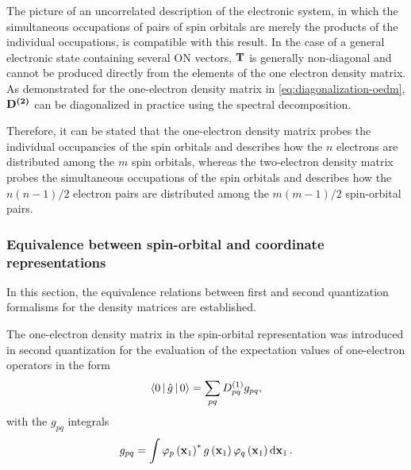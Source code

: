 The picture of an uncorrelated description of the electronic system, in which 
the simultaneous occupations of pairs of spin orbitals are merely the products 
of the individual occupations, is compatible with this result.
In the case of a general electronic state containing several ON vectors, $\boldsymbol{\mathrm{T}}$
is generally non-diagonal and cannot be produced directly from the elements of 
the one electron density matrix. As demonstrated for the one-electron density 
matrix in \cref{eq:diagonalization-oedm}, $ \boldsymbol{\mathrm{D^{\left( 2 \right)}}}$ can be diagonalized
in practice using the spectral decomposition.

Therefore, it can be stated that the one-electron density matrix probes the
individual occupancies of the spin orbitals and describes how the $n$ electrons
are distributed among the $m$ spin orbitals, whereas the two-electron density
matrix probes the simultaneous occupations of the spin orbitals and describes
how the $n\left( n-1 \right) /2$ electron pairs are distributed among the 
$m\left( m-1 \right) /2$ spin-orbital pairs.

\subsubsection{Equivalence between spin-orbital and coordinate representations}
In this section, the equivalence relations between first and second quantization
formalisms for the density matrices are established.


The one-electron density matrix in the spin-orbital representation was
introduced in second quantization for the evaluation of the expectation values
of one-electron operators in the form 
\begin{equation}
    \Braket{0 | \hat{g} | 0} =
    \sum_{pq} \oedm_{pq} g_{pq}
    ,
\end{equation}
with the $g_{pq}$ integrals 
\begin{equation}
    g_{pq} = \int
    \varphi_p \left( \boldsymbol{\mathrm{x}}_1 \right)^{*} 
    g \left( \boldsymbol{\mathrm{x}}_1 \right) 
    \varphi_q \left( \boldsymbol{\mathrm{x}}_1 \right)
    \dd{ \boldsymbol{\mathrm{x}}_1}
    .
\end{equation}

